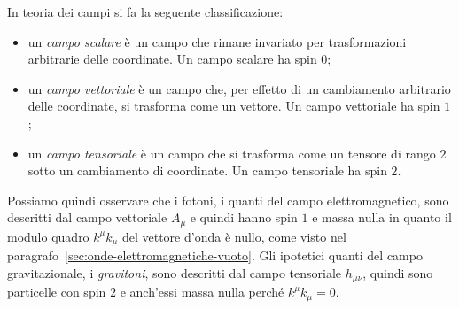 In teoria dei campi si fa la seguente classificazione:
\begin{itemize}
\item un \emph{campo scalare} è un campo che rimane invariato per trasformazioni
  arbitrarie delle coordinate.  Un campo scalare ha spin $0$;
\item un \emph{campo vettoriale} è un campo che, per effetto di un cambiamento
  arbitrario delle coordinate, si trasforma come un vettore.  Un campo
  vettoriale ha spin $1$;
\item un \emph{campo tensoriale} è un campo che si trasforma come un tensore di
  rango $2$ sotto un cambiamento di coordinate.  Un campo tensoriale ha spin
  $2$.
\end{itemize}
Possiamo quindi osservare che i fotoni, i quanti del campo elettromagnetico,
sono descritti dal campo vettoriale $A_{\mu}$ e quindi hanno spin $1$ e massa
nulla in quanto il modulo quadro $k^{\mu}k_{\mu}$ del vettore d'onda è nullo,
come visto nel paragrafo~\ref{sec:onde-elettromagnetiche-vuoto}.  Gli ipotetici
quanti del campo gravitazionale, i \emph{gravitoni}, sono
descritti dal campo tensoriale $h_{\mu\nu}$, quindi sono particelle con spin $2$
e anch'essi massa nulla perché $k^{\mu}k_{\mu} = 0$.

\section{}
\label{sec:rivelazione-onde}

